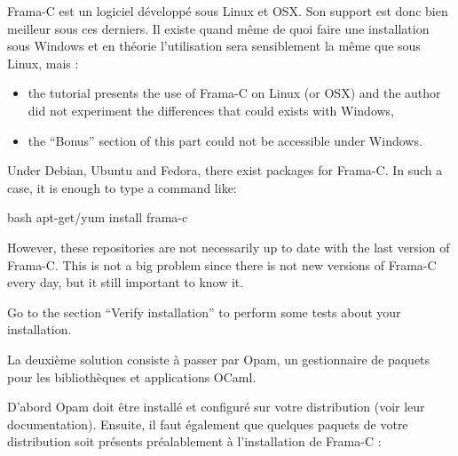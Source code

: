 \documentclass[middle]{zmdocument}
\begin{document}


Frama-C est un logiciel développé sous Linux et OSX. Son support est donc bien
meilleur sous ces derniers. Il existe quand même de quoi faire une installation 
sous Windows et en théorie l'utilisation sera sensiblement la même que sous 
Linux, mais :



\begin{Warning}
\begin{itemize}
  \item the tutorial presents the use of Frama-C on Linux (or OSX) and
    the author did not experiment the differences that could exists with Windows,
  \item the ``Bonus'' section of this part could not be accessible under Windows.
  \end{itemize}
\end{Warning}






Under Debian, Ubuntu and Fedora, there exist packages for Frama-C. In
such a case, it is enough to type a command like:



\begin{CodeBlock}{bash}
apt-get/yum install frama-c
\end{CodeBlock}



However, these repositories are not necessarily up to date with the last
version of Frama-C. This is not a big problem since there is not new
versions of Frama-C every day, but it still important to know it.



Go to the section ``Verify installation'' to perform some tests about
your installation.





La deuxième solution consiste à passer par Opam, un gestionnaire de paquets 
pour les bibliothèques et applications OCaml.



D'abord Opam doit être installé et configuré sur votre distribution (voir 
leur documentation). Ensuite, il faut également que quelques paquets de votre
distribution soit présents préalablement à l'installation de Frama-C :
\end{document}
